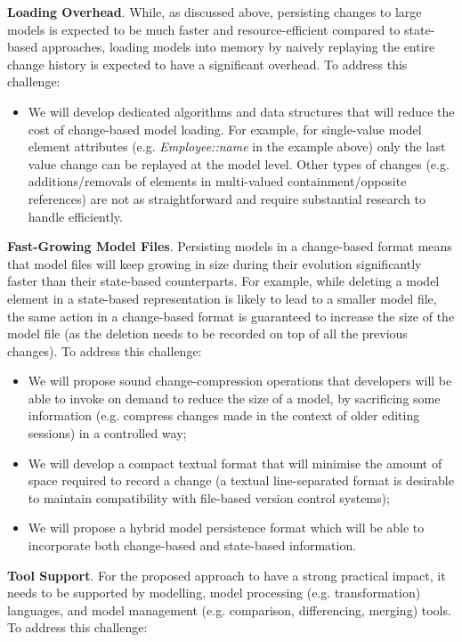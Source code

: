 \documentclass{llncs}
\begin{document}
\textbf{Loading Overhead}. While, as discussed above, persisting changes to large models is expected to be much faster and resource-efficient compared to state-based approaches, loading models into memory by naively replaying the entire change history is expected to have a significant overhead. To address this challenge:

\begin{itemize}
\item We will develop dedicated algorithms and data structures that will reduce the cost of change-based model loading. For example, for single-value model element attributes (e.g. \emph{Employee::name} in the example above) only the last value change can be replayed at the model level. Other types of changes (e.g. additions/removals of elements in multi-valued containment/opposite references) are not as straightforward and require substantial research to handle efficiently.
\end{itemize}

\textbf{Fast-Growing Model Files}. Persisting models in a change-based format means that model files will keep growing in size during their evolution significantly faster than their state-based counterparts. For example, while deleting a model element in a state-based representation is likely to lead to a
smaller model file, the same action in a change-based format is guaranteed to increase the size of the model file (as the deletion needs to be recorded on top of all the previous changes). To address this challenge:

\begin{itemize}
\item We will propose sound change-compression operations that developers will be able to invoke on demand to reduce the size of a model, by sacrificing some information (e.g. compress changes made in the context of older editing sessions) in a controlled way;
\item We will develop a compact textual format that will minimise the amount of space required to record a change (a textual line-separated format is desirable to maintain compatibility with file-based version control systems);
\item We will propose a hybrid model persistence format which will be able to incorporate both change-based and state-based information. 
\end{itemize}

\textbf{Tool Support}. For the proposed approach to have a strong practical impact, it needs to be supported by modelling, model processing (e.g. transformation) languages, and model management (e.g. comparison, differencing, merging) tools. To address this challenge:
\end{document}
